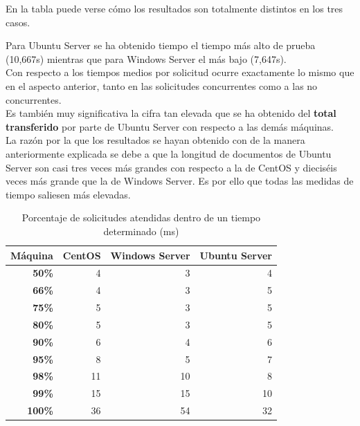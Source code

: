 En la tabla puede verse cómo los resultados son totalmente distintos en los tres casos.

Para Ubuntu Server se ha obtenido tiempo el tiempo más alto de prueba (10,667s) mientras que para Windows Server el más bajo (7,647s).
\\

Con respecto a los tiempos medios por solicitud ocurre exactamente lo mismo que en el aspecto anterior, tanto en las solicitudes concurrentes como a las no concurrentes.\\

Es también muy significativa la cifra tan elevada que se ha obtenido del \textbf{total transferido} por parte de Ubuntu Server con respecto a las demás máquinas.\\

La razón por la que los resultados se hayan obtenido con de la manera anteriormente explicada se debe a que la longitud de documentos de Ubuntu Server son casi tres veces más grandes con respecto a la de CentOS y dieciséis veces más grande que la de Windows Server. Es por ello que todas las medidas de tiempo saliesen más elevadas.

\begin{table}[H]
	\centering
	\begin{tabular}{rrrr}
		\multicolumn{1}{l}{\textbf{Máquina}} & \multicolumn{1}{l}{\textbf{CentOS}} & \multicolumn{1}{l}{\textbf{Windows Server}} & \multicolumn{1}{l}{\textbf{Ubuntu Server}} \\
		\hline
		\textbf{50\%}  & 4     & 3     & 4 \\
		\textbf{66\%}  & 4     & 3     & 5 \\
		\textbf{75\%}  & 5     & 3     & 5 \\
		\textbf{80\%}  & 5     & 3     & 5 \\
		\textbf{90\%}  & 6     & 4     & 6 \\
		\textbf{95\%}  & 8     & 5     & 7 \\
		\textbf{98\%}  & 11    & 10    & 8 \\
		\textbf{99\%}  & 15    & 15    & 10 \\
		\textbf{100\%} & 36    & 54    & 32 \\
	\end{tabular}%
	\caption{Porcentaje de solicitudes atendidas dentro de un tiempo determinado (ms)}
	\label{tab:addlabel1}%
\end{table}%

